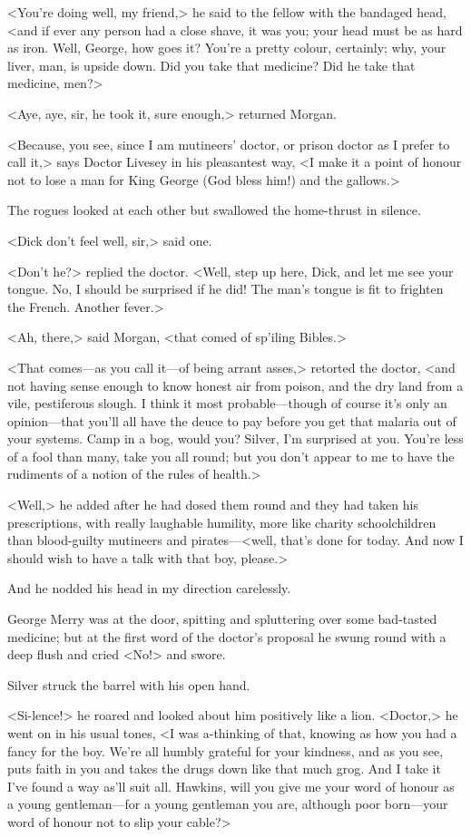 <You're doing well, my friend,> he said to the fellow with the bandaged head, <and if ever any person had a close shave, it was you; your head must be as hard as iron. Well, George, how goes it? You're a pretty colour, certainly; why, your liver, man, is upside down. Did you take that medicine? Did he take that medicine, men?>

<Aye, aye, sir, he took it, sure enough,> returned Morgan.

<Because, you see, since I am mutineers' doctor, or prison doctor as I prefer to call it,> says Doctor Livesey in his pleasantest way, <I make it a point of honour not to lose a man for King George (God bless him!) and the gallows.>

The rogues looked at each other but swallowed the home-thrust in silence.

<Dick don't feel well, sir,> said one.

<Don't he?> replied the doctor. <Well, step up here, Dick, and let me see your tongue. No, I should be surprised if he did! The man's tongue is fit to frighten the French. Another fever.>

<Ah, there,> said Morgan, <that comed of sp'iling Bibles.>

<That comes—as you call it—of being arrant asses,> retorted the doctor, <and not having sense enough to know honest air from poison, and the dry land from a vile, pestiferous slough. I think it most probable—though of course it's only an opinion—that you'll all have the deuce to pay before you get that malaria out of your systems. Camp in a bog, would you? Silver, I'm surprised at you. You're less of a fool than many, take you all round; but you don't appear to me to have the rudiments of a notion of the rules of health.>

<Well,> he added after he had dosed them round and they had taken his prescriptions, with really laughable humility, more like charity schoolchildren than blood-guilty mutineers and pirates—<well, that's done for today. And now I should wish to have a talk with that boy, please.>

And he nodded his head in my direction carelessly.

George Merry was at the door, spitting and spluttering over some bad-tasted medicine; but at the first word of the doctor's proposal he swung round with a deep flush and cried <No!> and swore.

Silver struck the barrel with his open hand.

<Si-lence!> he roared and looked about him positively like a lion. <Doctor,> he went on in his usual tones, <I was a-thinking of that, knowing as how you had a fancy for the boy. We're all humbly grateful for your kindness, and as you see, puts faith in you and takes the drugs down like that much grog. And I take it I've found a way as'll suit all. Hawkins, will you give me your word of honour as a young gentleman—for a young gentleman you are, although poor born—your word of honour not to slip your cable?>

